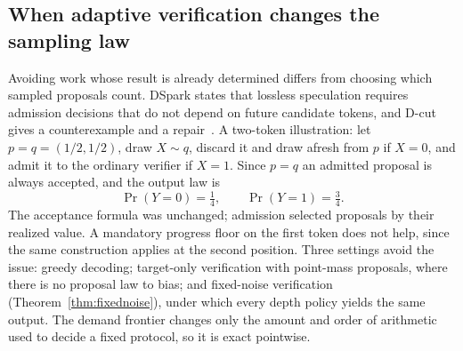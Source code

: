 \subsection{When adaptive verification changes the sampling law}\label{sec:stopping}
Avoiding work whose result is already determined differs from choosing which sampled proposals count. DSpark states that lossless speculation requires admission decisions that do not depend on future candidate tokens, and D-cut gives a counterexample and a repair~\cite{dspark,dcut}. A two-token illustration: let $p=q=(1/2,1/2)$, draw $X\sim q$, discard it and draw afresh from $p$ if $X=0$, and admit it to the ordinary verifier if $X=1$. Since $p=q$ an admitted proposal is always accepted, and the output law is
\begin{equation}
\Pr(Y=0)=\tfrac14,\qquad\Pr(Y=1)=\tfrac34.\label{eq:bias}
\end{equation}
The acceptance formula was unchanged; admission selected proposals by their realized value. A mandatory progress floor on the first token does not help, since the same construction applies at the second position. Three settings avoid the issue: greedy decoding; target-only verification with point-mass proposals, where there is no proposal law to bias; and fixed-noise verification (Theorem~\ref{thm:fixednoise}), under which every depth policy yields the same output. The demand frontier changes only the amount and order of arithmetic used to decide a fixed protocol, so it is exact pointwise.

